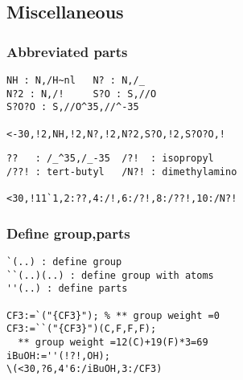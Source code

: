 \documentclass[a4paper]{article}
\begin{document}
\subsection{Miscellaneous}
\subsubsection{Abbreviated parts}
%
%
%
%
%
\begin{verbatim}
NH : N,/H~nl   N? : N,/_ 
N?2 : N,/!     S?O : S,//O
S?O?O : S,//O^35,//^-35

<-30,!2,NH,!2,N?,!2,N?2,S?O,!2,S?O?O,!
\end{verbatim}
%
%
%
%
\begin{verbatim}
??   : /_^35,/_-35  /?!  : isopropyl
/??! : tert-butyl   /N?! : dimethylamino

<30,!11`1,2:??,4:/!,6:/?!,8:/??!,10:/N?!
\end{verbatim}
\subsubsection{Define group,parts}
%
%
%
\begin{verbatim}
`(..) : define group
``(..)(..) : define group with atoms
''(..) : define parts

CF3:=`("{CF3}"); % ** group weight =0
CF3:=``("{CF3}")(C,F,F,F);
  ** group weight =12(C)+19(F)*3=69
iBuOH:=''(!?!,OH);
\(<30,?6,4'6:/iBuOH,3:/CF3)
\end{verbatim}
\end{document}
